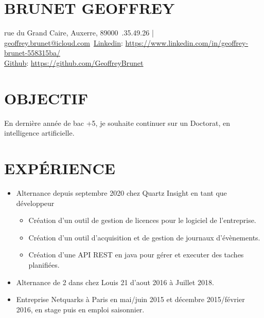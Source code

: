 \documentclass[a4paper,twoside]{article}
\begin{document}
\begin{multicols}{2}

    \section*{BRUNET GEOFFREY}

     rue du Grand Caire, Auxerre, 89000\ .35.49.26 | \href{mailto:geoffrey-brunet89@outlook.fr}{geoffrey.brunet@icloud.com}\
    \href{https://www.linkedin.com/in/geoffrey-brunet-558315ba/}{Linkedin}: \url{https://www.linkedin.com/in/geoffrey-brunet-558315ba/}\\
    \href{https://github.com/GeoffreyBrunet}{Github}: \url{https://github.com/GeoffreyBrunet}

    \section*{OBJECTIF}

    \noindent En dernière année de bac +5, je souhaite continuer sur un Doctorat, en intelligence artificielle.

    \section*{EXPÉRIENCE}

    \begin{itemize}
        \item Alternance depuis septembre 2020 chez Quartz Insight en tant que développeur
              \begin{itemize}
                  \item Création d'un outil de gestion de licences pour le logiciel de l'entreprise.
                  \item Création d'un outil d'acquisition et de gestion de journaux d'évènements.
                  \item Création d'une API REST en java pour gérer et executer des taches planifiées.
              \end{itemize}
        \item Alternance de 2 dans chez Louis 21 d’aout 2016 à Juillet 2018.
        \item Entreprise Netquarks à Paris en mai/juin 2015 et décembre 2015/février 2016, en stage puis en emploi saisonnier.
    \end{itemize}


\end{multicols}
\end{document}
